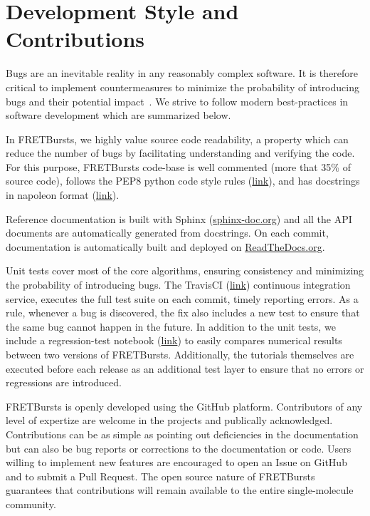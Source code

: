 \section{Development Style and Contributions}

Bugs are an inevitable reality in any reasonably complex software. It is 
therefore critical to implement countermeasures to
minimize the probability of introducing bugs and their potential impact~\cite{Prli__2012, Wilson_2014}.
We strive to follow modern best-practices in software development which are summarized 
below.

In FRETBursts, we highly value source code readability, a property which can 
reduce the number of bugs by facilitating understanding and verifying the code.
For this purpose, FRETBursts code-base is well commented (more that 35\%
of source code), 
follows the PEP8 python code style rules (\href{https://www.python.org/dev/peps/pep-0008/}{link}),
and has docstrings in napoleon format (\href{http://sphinxcontrib-napoleon.readthedocs.org/}{link}).

Reference documentation is built with Sphinx (\href{http://sphinx-doc.org/}{sphinx-doc.org})
and all the API documents are automatically generated from docstrings.
On each commit, documentation is automatically built and deployed on
\href{https://readthedocs.org/}{ReadTheDocs.org}.

Unit tests cover most of the core algorithms, ensuring consistency and
minimizing the probability of introducing bugs. 
The TravisCI (\href{http://travis-ci.org}{link}) continuous integration service, 
executes the full test suite on each commit, timely reporting errors.
As a rule, whenever a bug is discovered, the  fix also includes a new test
to ensure that the same bug cannot happen in the future.
In addition to the unit tests, we include a regression-test notebook
(\href{https://github.com/tritemio/FRETBursts/blob/master/notebooks/dev/tests/FRETBursts%20-%20Regression%20tests.ipynb}{link})
to easily compares numerical results between two versions of FRETBursts. 
Additionally, the tutorials themselves are executed before each release as
an additional test layer to ensure that no errors or regressions are introduced.

FRETBursts is openly developed using the GitHub platform.
Contributors of any level of expertize are welcome in the projects
and publically acknowledged.
Contributions can be as simple as pointing out deficiencies in the 
documentation but can also be bug reports or corrections to 
the documentation or code. Users willing to implement
new features are encouraged to open an Issue on GitHub and to submit
a Pull Request. The open source nature of FRETBursts guarantees that
contributions will remain available to the entire single-molecule 
community.

